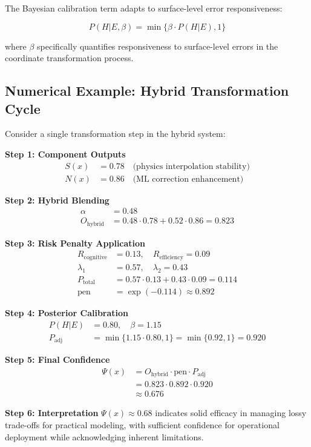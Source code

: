 The Bayesian calibration term adapts to surface-level error responsiveness:

\begin{equation}
P(H|E,\beta) = \min\{\beta \cdot P(H|E), 1\}
\end{equation}

where $\beta$ specifically quantifies responsiveness to surface-level errors in the coordinate transformation process.

\subsection{Numerical Example: Hybrid Transformation Cycle}

Consider a single transformation step in the hybrid system:

\begin{examplebox}
\textbf{Step 1: Component Outputs}
\begin{align}
S(x) &= 0.78 \quad \text{(physics interpolation stability)} \\
N(x) &= 0.86 \quad \text{(ML correction enhancement)}
\end{align}

\textbf{Step 2: Hybrid Blending}
\begin{align}
\alpha &= 0.48 \\
O_{\text{hybrid}} &= 0.48 \cdot 0.78 + 0.52 \cdot 0.86 = 0.823
\end{align}

\textbf{Step 3: Risk Penalty Application}
\begin{align}
R_{\text{cognitive}} &= 0.13, \quad R_{\text{efficiency}} = 0.09 \\
\lambda_1 &= 0.57, \quad \lambda_2 = 0.43 \\
P_{\text{total}} &= 0.57 \cdot 0.13 + 0.43 \cdot 0.09 = 0.114 \\
\text{pen} &= \exp(-0.114) \approx 0.892
\end{align}

\textbf{Step 4: Posterior Calibration}
\begin{align}
P(H|E) &= 0.80, \quad \beta = 1.15 \\
P_{\text{adj}} &= \min\{1.15 \cdot 0.80, 1\} = \min\{0.92, 1\} = 0.920
\end{align}

\textbf{Step 5: Final Confidence}
\begin{align}
\Psi(x) &= O_{\text{hybrid}} \cdot \text{pen} \cdot P_{\text{adj}} \\
&= 0.823 \cdot 0.892 \cdot 0.920 \\
&\approx 0.676
\end{align}

\textbf{Step 6: Interpretation}
$\Psi(x) \approx 0.68$ indicates solid efficacy in managing lossy trade-offs for practical modeling, with sufficient confidence for operational deployment while acknowledging inherent limitations.
\end{examplebox}

